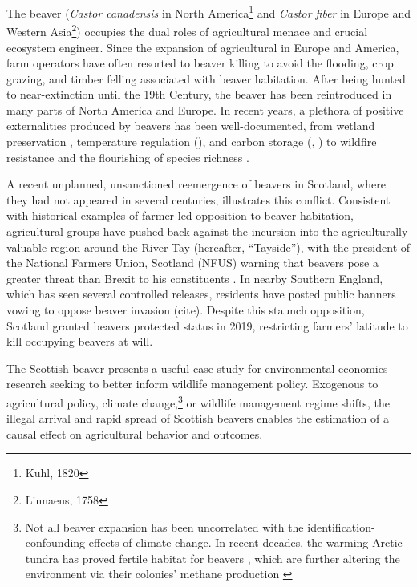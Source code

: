 The beaver (\textit{Castor canadensis} in North America\footnote{Kuhl, 1820} and \textit{Castor fiber} in Europe and Western Asia\footnote{Linnaeus, 1758}) occupies the dual roles of agricultural menace and crucial ecosystem engineer. Since the expansion of agricultural in Europe and America, farm operators have often resorted to beaver killing to avoid the flooding, crop grazing, and timber felling associated with beaver habitation. After being hunted to near-extinction until the 19th Century, the beaver has been reintroduced in many parts of North America and Europe. In recent years, a plethora of positive externalities produced by beavers has been well-documented, from wetland preservation \citep{hood_beaver_2008}, temperature regulation (\cite{dittbrenner_relocated_2022}), and carbon storage (\cite{wohl_landscape-scale_2013}, \cite{johnston_beaver_2014}) to wildfire resistance \citep{fairfax_smokey_2020} and the flourishing of species richness \citep{wright_ecosystem_2002}.

A recent unplanned, unsanctioned reemergence of beavers in Scotland, where they had not appeared in several centuries, illustrates this conflict. Consistent with historical examples of farmer-led opposition to beaver habitation, agricultural groups have pushed back against the incursion into the agriculturally valuable region around the River Tay (hereafter, ``Tayside''), with the president of the National Farmers Union, Scotland (NFUS) warning that beavers pose a greater threat than Brexit to his constituents \citep{castle_beavers_2021}. In nearby Southern England, which has seen several controlled releases, residents have posted public banners vowing to oppose beaver invasion (cite). Despite this staunch opposition, Scotland granted beavers protected status in 2019, restricting farmers' latitude to kill occupying beavers at will.

The Scottish beaver presents a useful case study for environmental economics research seeking to better inform wildlife management policy. Exogenous to agricultural policy, climate change,\footnote{Not all beaver expansion has been uncorrelated with the identification-confounding effects of climate change. In recent decades, the warming Arctic tundra has proved fertile habitat for beavers \citep{tape_expanding_2022}, which are further altering the environment via their colonies' methane production \citep{clark_beaver_2023}} or wildlife management regime shifts, the illegal arrival and rapid spread of Scottish beavers enables the estimation of a causal effect on agricultural behavior and outcomes.

